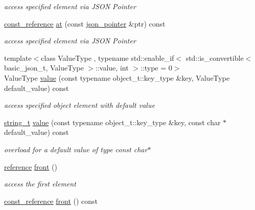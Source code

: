 \begin{DoxyCompactItemize}
\begin{DoxyCompactList}\small\item\em access specified element via J\-S\-O\-N Pointer \end{DoxyCompactList}\item 
\hyperlink{classnlohmann_1_1basic__json_af677a29b0e66edc9f66e5167e4667071}{const\-\_\-reference} \hyperlink{classnlohmann_1_1basic__json_a0d46dd5ef4992fb80f9f0d9f56f16eae}{at} (const \hyperlink{classnlohmann_1_1basic__json_1_1json__pointer}{json\-\_\-pointer} \&ptr) const 
\begin{DoxyCompactList}\small\item\em access specified element via J\-S\-O\-N Pointer \end{DoxyCompactList}\item 
{\footnotesize template$<$class Value\-Type , typename std\-::enable\-\_\-if$<$ std\-::is\-\_\-convertible$<$ basic\-\_\-json\-\_\-t, Value\-Type $>$\-::value, int $>$\-::type  = 0$>$ }\\Value\-Type \hyperlink{classnlohmann_1_1basic__json_a0a2cbbd95862a623e7dc5c37e67dead0}{value} (const typename object\-\_\-t\-::key\-\_\-type \&key, Value\-Type default\-\_\-value) const 
\begin{DoxyCompactList}\small\item\em access specified object element with default value \end{DoxyCompactList}\item 
\hyperlink{classnlohmann_1_1basic__json_ab63e618bbb0371042b1bec17f5891f42}{string\-\_\-t} \hyperlink{classnlohmann_1_1basic__json_af071057ebab57744f5767eb369e99d42}{value} (const typename object\-\_\-t\-::key\-\_\-type \&key, const char $\ast$default\-\_\-value) const 
\begin{DoxyCompactList}\small\item\em overload for a default value of type const char$\ast$ \end{DoxyCompactList}\item 
\hyperlink{classnlohmann_1_1basic__json_a3ec8e17be8732fe436e9d6733f52b7a3}{reference} \hyperlink{classnlohmann_1_1basic__json_aa45753034bea87f9d2c0c42ace9ff75c}{front} ()
\begin{DoxyCompactList}\small\item\em access the first element \end{DoxyCompactList}\item 
\hyperlink{classnlohmann_1_1basic__json_af677a29b0e66edc9f66e5167e4667071}{const\-\_\-reference} \hyperlink{classnlohmann_1_1basic__json_a8032645ce3109a7a4899badd90fa3480}{front} () const 

\end{DoxyCompactItemize}
